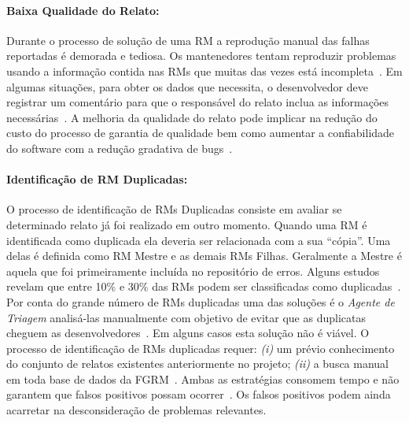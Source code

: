 \paragraph{Baixa Qualidade do Relato:}

Durante o processo de solução de uma RM a reprodução manual das falhas
reportadas é demorada e tediosa. Os mantenedores tentam reproduzir problemas
usando a informação contida nas RMs que muitas das vezes está
incompleta~\cite{White:2015:GRR:2820282.2820291}. Em algumas situações, para
obter os dados que necessita, o desenvolvedor deve registrar um comentário para
que o responsável do relato inclua as informações necessárias~\cite{5070993}.
A melhoria da qualidade do relato pode implicar na redução do custo do processo
de garantia de qualidade bem como aumentar a confiabilidade do software com a
redução gradativa de bugs~\cite{Tu:2014:MQI:2677832.2677844}.



\paragraph{Identificação de RM Duplicadas:}

O processo de identificação de RMs Duplicadas consiste em avaliar se determinado
relato já foi realizado em outro momento. Quando uma RM é identificada como
duplicada ela deveria ser relacionada com a sua ``cópia''. Uma delas é definida
como RM Mestre e as demais RMs Filhas. Geralmente a Mestre é aquela que foi
primeiramente incluída no repositório de erros. Alguns estudos revelam que entre
10\% e 30\% das RMs podem ser classificadas como
duplicadas~\cite{anvik2005coping,cavalcanti2013bug,Runeson:2007:DDD:1248820.1248882}.
Por conta do grande número de RMs duplicadas uma das soluções é o \textit{Agente
    de Triagem} analisá-las manualmente com objetivo de evitar que as duplicatas
cheguem as desenvolvedores~\cite{anvik2005coping}. Em alguns casos esta solução
não é viável.
O processo de identificação de RMs duplicadas requer: \textit{(i)} um prévio
conhecimento do conjunto de relatos existentes anteriormente no projeto;
\textit{(ii)} a busca manual em toda base de dados da
FGRM~\cite{banerjee2012automated,
    Lerch:2013:FDY:2495256.2495763,hindle2016contextual}. Ambas as estratégias
consomem tempo e não garantem que falsos positivos possam
ocorrer~\cite{kaushik2012comparative}. Os falsos positivos podem ainda acarretar
na desconsideração de problemas relevantes.

